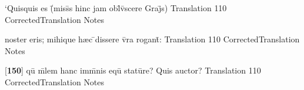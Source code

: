 \latline
  {`Quisquis es (\={}miss\={}s hinc jam obl\={\macron {\i}}v\={\macron {\i}}scere Graj\={}s)}
  { Translation }
  {110}
  { CorrectedTranslation }
  { Notes }


\latline
  {noster eris; mihique h{\ae}c \={}dissere v\={}ra rogant\={\macron {\i}}:}
  { Translation }
  {110}
  { CorrectedTranslation }
  { Notes }


\latline
  {[\textbf{150}] qu\={} m\={}lem hanc imm\={}nis equ\={\macron {\i}} statu\={}re?  Quis auctor?}
  { Translation }
  {110}
  { CorrectedTranslation }
  { Notes }


